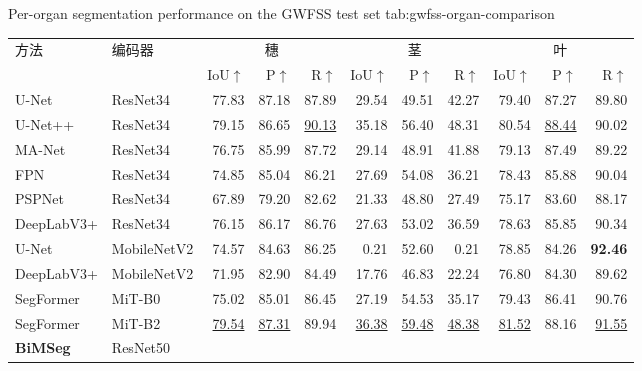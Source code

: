 \begin{table}[!htb]
  \centering
    {Per-organ segmentation performance on the GWFSS test set}
    {tab:gwfss-organ-comparison}
  \begin{spacing}{1.2}
    \small
    \setlength{\tabcolsep}{2pt}
    \renewcommand{\arraystretch}{1.15}
    \begin{tabular*}{\linewidth}{@{\extracolsep{\fill}}ll*{9}{r}@{}}
      \toprule
      方法 & 编码器 & \multicolumn{3}{c}{穗}
        & \multicolumn{3}{c}{茎} & \multicolumn{3}{c}{叶} \\
      \cmidrule(lr){3-5}\cmidrule(lr){6-8}\cmidrule(lr){9-11}
      & & IoU\(\uparrow\) & P\(\uparrow\) & R\(\uparrow\)
        & IoU\(\uparrow\) & P\(\uparrow\) & R\(\uparrow\)
        & IoU\(\uparrow\) & P\(\uparrow\) & R\(\uparrow\) \\
      \midrule
      U-Net & ResNet34
        & 77.83 & 87.18 & 87.89 & 29.54 & 49.51 & 42.27 & 79.40 & 87.27 & 89.80 \\
      U-Net++ & ResNet34
        & 79.15 & 86.65 & \underline{90.13} & 35.18 & 56.40 & 48.31
        & 80.54 & \underline{88.44} & 90.02 \\
      MA-Net & ResNet34
        & 76.75 & 85.99 & 87.72 & 29.14 & 48.91 & 41.88 & 79.13 & 87.49 & 89.22 \\
      FPN & ResNet34
        & 74.85 & 85.04 & 86.21 & 27.69 & 54.08 & 36.21 & 78.43 & 85.88 & 90.04 \\
      PSPNet & ResNet34
        & 67.89 & 79.20 & 82.62 & 21.33 & 48.80 & 27.49 & 75.17 & 83.60 & 88.17 \\
      DeepLabV3+ & ResNet34
        & 76.15 & 86.17 & 86.76 & 27.63 & 53.02 & 36.59 & 78.63 & 85.85 & 90.34 \\
      U-Net & MobileNetV2
        & 74.57 & 84.63 & 86.25 & 0.21 & 52.60 & 0.21 & 78.85 & 84.26 & \textbf{92.46} \\
      DeepLabV3+ & MobileNetV2
        & 71.95 & 82.90 & 84.49 & 17.76 & 46.83 & 22.24 & 76.80 & 84.30 & 89.62 \\
      SegFormer & MiT-B0
        & 75.02 & 85.01 & 86.45 & 27.19 & 54.53 & 35.17 & 79.43 & 86.41 & 90.76 \\
      SegFormer & MiT-B2
        & \underline{79.54} & \underline{87.31} & 89.94
        & \underline{36.38} & \underline{59.48} & \underline{48.38}
        & \underline{81.52} & 88.16 & \underline{91.55} \\
      \midrule
      \textbf{BiMSeg} & ResNet50

\end{tabular*}
\end{spacing}
\end{table}

